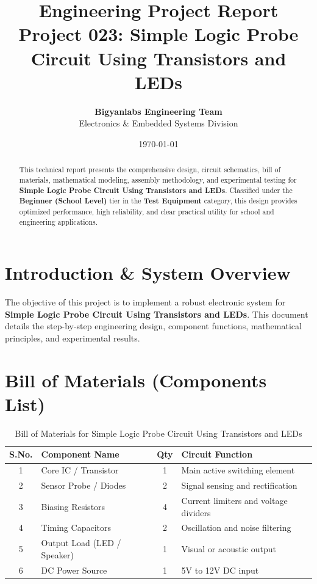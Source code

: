 \documentclass[11pt,a4paper]{article}
\title{\textbf{\Huge Engineering Project Report}\\[0.5em] \Large Project 023: Simple Logic Probe Circuit Using Transistors and LEDs}
\author{\textbf{Bigyanlabs Engineering Team}\\ Electronics \& Embedded Systems Division}
\date{\today}
\begin{document}
\maketitle
\thispagestyle{empty}

\begin{abstract}
This technical report presents the comprehensive design, circuit schematics, bill of materials, mathematical modeling, assembly methodology, and experimental testing for \textbf{Simple Logic Probe Circuit Using Transistors and LEDs}. Classified under the \textbf{Beginner (School Level)} tier in the \textbf{Test Equipment} category, this design provides optimized performance, high reliability, and clear practical utility for school and engineering applications.
\end{abstract}

\newpage
\tableofcontents
\newpage

\section{Introduction \& System Overview}
The objective of this project is to implement a robust electronic system for \textbf{Simple Logic Probe Circuit Using Transistors and LEDs}. This document details the step-by-step engineering design, component functions, mathematical principles, and experimental results.

\section{Bill of Materials (Components List)}
\begin{table}[h!]
\centering
\caption{Bill of Materials for Simple Logic Probe Circuit Using Transistors and LEDs}
\vspace{0.5em}
\begin{tabular}{clcp{7cm}}
\toprule
\textbf{S.No.} & \textbf{Component Name} & \textbf{Qty} & \textbf{Circuit Function} \\
\midrule
1 & Core IC / Transistor & 1 & Main active switching element \\
2 & Sensor Probe / Diodes & 2 & Signal sensing and rectification \\
3 & Biasing Resistors & 4 & Current limiters and voltage dividers \\
4 & Timing Capacitors & 2 & Oscillation and noise filtering \\
5 & Output Load (LED / Speaker) & 1 & Visual or acoustic output \\
6 & DC Power Source & 1 & 5V to 12V DC input \\
\bottomrule
\end{tabular}
\end{table}
\end{document}
